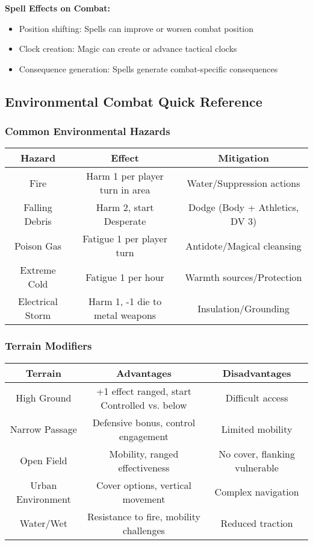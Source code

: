 \textbf{Spell Effects on Combat:}
\begin{itemize}[leftmargin=*]
    \item Position shifting: Spells can improve or worsen combat position
    \item Clock creation: Magic can create or advance tactical clocks
    \item Consequence generation: Spells generate combat-specific consequences
\end{itemize}

\subsection{Environmental Combat Quick Reference}

\subsubsection{Common Environmental Hazards}
\begin{center}
\begin{tabular}{|c|c|c|}
\hline
\textbf{Hazard} & \textbf{Effect} & \textbf{Mitigation} \\
\hline
Fire & Harm 1 per player turn in area & Water/Suppression actions \\
\hline
Falling Debris & Harm 2, start Desperate & Dodge (Body + Athletics, DV 3) \\
\hline
Poison Gas & Fatigue 1 per player turn & Antidote/Magical cleansing \\
\hline
Extreme Cold & Fatigue 1 per hour & Warmth sources/Protection \\
\hline
Electrical Storm & Harm 1, -1 die to metal weapons & Insulation/Grounding \\
\hline
\end{tabular}
\end{center}

\subsubsection{Terrain Modifiers}
\begin{center}
\begin{tabular}{|c|c|c|}
\hline
\textbf{Terrain} & \textbf{Advantages} & \textbf{Disadvantages} \\
\hline
High Ground & +1 effect ranged, start Controlled vs. below & Difficult access \\
\hline
Narrow Passage & Defensive bonus, control engagement & Limited mobility \\
\hline
Open Field & Mobility, ranged effectiveness & No cover, flanking vulnerable \\
\hline
Urban Environment & Cover options, vertical movement & Complex navigation \\
\hline
Water/Wet & Resistance to fire, mobility challenges & Reduced traction \\
\hline
\end{tabular}
\end{center}


